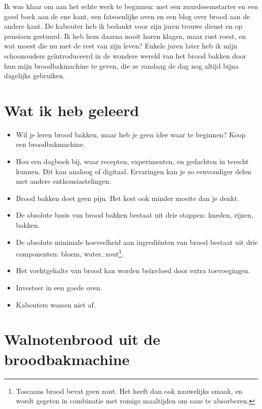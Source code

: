 \documentclass[
  11pt,
  dutch,
]{memoir}
\providecommand{\tightlist}{%
  \setlength{\itemsep}{0pt}\setlength{\parskip}{0pt}}
\begin{document}
Ik was klaar om aan het echte werk te beginnen: met een zuurdesemstarter
en een goed boek aan de ene kant, een fatsoenlijke oven en een blog over
brood aan de andere kant. De kabouter heb ik bedankt voor zijn jaren
trouwe dienst en op pensioen gestuurd. Ik heb hem daarna nooit horen
klagen, maar rust roest, en wat moest die nu met de rest van zijn leven?
Enkele jaren later heb ik mijn schoonouders geïntroduceerd in de wondere
wereld van het brood bakken door hun mijn broodbakmachine te geven, die
ze vandaag de dag nog altijd bijna dagelijks gebruiken.

\newpage

\hypertarget{wat-ik-heb-geleerd}{%
\section{Wat ik heb geleerd}\label{wat-ik-heb-geleerd}}

\begin{itemize}
\tightlist
\item
  Wil je leren brood bakken, maar heb je geen idee waar te beginnen?
  Koop een broodbakmachine.
\item
  Hou een dagboek bij, waar recepten, experimenten, en gedachten in
  terecht kunnen. Dit kan analoog of digitaal. Ervaringen kan je zo
  eenvoudiger delen met andere enthousiastelingen.
\item
  Brood bakken doet geen pijn. Het kost ook minder moeite dan je denkt.
\item
  De absolute basis van brood bakken bestaat uit drie stappen: kneden,
  rijzen, bakken.
\item
  De absolute minimale hoeveelheid aan ingrediënten van brood bestaat
  uit drie componenten: bloem, water, zout\footnote{Toscaans brood bevat
    geen zout. Het heeft dan ook nauwelijks smaak, en wordt gegeten in
    combinatie met romige maaltijden om saus te absorberen.}.
\item
  Het vochtgehalte van brood kan worden beïnvloed door extra
  toevoegingen.
\item
  Investeer in een goede oven.
\item
  Kabouters wassen niet af.
\end{itemize}

\newpage

\hypertarget{walnotenbrood-uit-de-broodbakmachine}{%
\section{Walnotenbrood uit de
broodbakmachine}\label{walnotenbrood-uit-de-broodbakmachine}}
\end{document}

